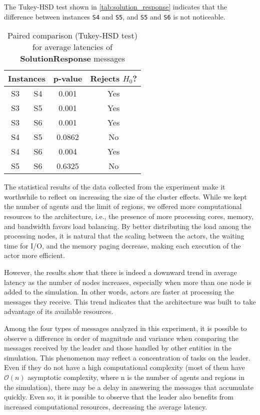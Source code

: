 \documentclass[preprint,12pt]{elsarticle}
\begin{document}
The Tukey-HSD test shown in \autoref{tab:solution_response} indicates that the difference between instances \texttt{S4} and \texttt{S5}, and \texttt{S5} and \texttt{S6} is not noticeable. 

\begin{table}[ht!]
    \centering
    \caption{Paired comparison (Tukey-HSD test) for average latencies of \textbf{SolutionResponse} messages}
    \begin{tabular}{cccc}
    \toprule
    \multicolumn{2}{c}{\textbf{Instances}} & \textbf{p-value} & \textbf{Rejects $H_0$?}\\
    \midrule
    S3  &  S4 & 0.001   & Yes  \\
    S3  &  S5 & 0.001   & Yes  \\
    S3  &  S6 & 0.001   & Yes  \\
    S4  &  S5 &  0.0862 & No \\
    S4  &  S6 &   0.004 & Yes  \\
    S5  &  S6 &  0.6325 & No \\
     \bottomrule
    \end{tabular}
    \label{tab:solution_response}
\end{table}

The statistical results of the data collected from the experiment make it worthwhile to reflect on increasing the size of the cluster effects. While we kept the number of agents and the limit of regions, we offered more computational resources to the architecture, i.e., the presence of more processing cores, memory, and bandwidth favors load balancing. By better distributing the load among the processing nodes, it is natural that the scaling between the actors, the waiting time for I/O, and the memory paging decrease, making each execution of the actor more efficient.

However, the results show that there is indeed a downward trend in average latency as the number of nodes increases, especially when more than one node is added to the simulation. In other words, actors are faster at processing the messages they receive. This trend indicates that the architecture was built to take advantage of its available resources.

Among the four types of messages analyzed in this experiment, it is possible to observe a difference in order of magnitude and variance when comparing the messages received by the leader and those handled by other entities in the simulation. This phenomenon may reflect a concentration of tasks on the leader. Even if they do not have a high computational complexity (most of them have $\mathcal{O}(n)$ asymptotic complexity, where n is the number of agents and regions in the simulation), there may be a delay in answering the messages that accumulate quickly. Even so, it is possible to observe that the leader also benefits from increased computational resources, decreasing the average latency.
\end{document}
